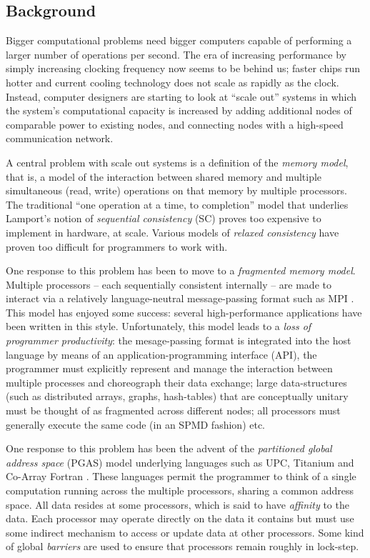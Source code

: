 
\subsection*{Background}

Bigger computational problems need bigger computers capable of
performing a larger number of operations per second. The era of
increasing performance by simply increasing clocking frequency now
seems to be behind us; faster chips run hotter and current cooling
technology does not scale as rapidly as the clock. Instead, computer
designers are starting to look at ``scale out'' systems in which the
system's computational capacity is increased by adding additional
nodes of comparable power to existing nodes, and connecting nodes with
a high-speed communication network.

A central problem with scale out systems is a definition of the {\em
memory model}, that is, a model of the interaction between shared
memory and multiple simultaneous (read, write) operations on that
memory by multiple processors. The traditional ``one operation at a
time, to completion'' model that underlies Lamport's notion of {\em
sequential consistency} (SC) proves too expensive to implement in
hardware, at scale. Various models of {\em relaxed consistency} have
proven too difficult for programmers to work with.  

One response to this problem has been to move to a {\em fragmented
memory model}. Multiple processors -- each sequentially consistent
internally -- are made to interact via a relatively language-neutral
message-passing format such as MPI \cite{mpi}. This model has enjoyed
some success: several high-performance applications have been written
in this style. Unfortunately, this model leads to a {\em loss of
programmer productivity}: the mesage-passing format is integrated into
the host language by means of an application-programming interface
(API), the programmer must explicitly represent and manage the
interaction between multiple processes and choreograph their data
exchange; large data-structures (such as distributed arrays, graphs,
hash-tables) that are conceptually unitary must be thought of as
fragmented across different nodes; all processors must generally
execute the same code (in an SPMD fashion) etc.

One response to this problem has been the advent of the {\em
partitioned global address space} (PGAS) model underlying languages such as
UPC, Titanium and Co-Array Fortran \cite{pgas}. These languages permit
the programmer to think of a single computation running across the
multiple processors, sharing a common address space. All data resides
at some processors, which is said to have {\em affinity} to the
data. Each processor may operate directly on the data it contains but
must use some indirect mechanism to access or update data at other
processors. Some kind of global {\em barriers} are used to ensure that
processors remain roughly in lock-step.

